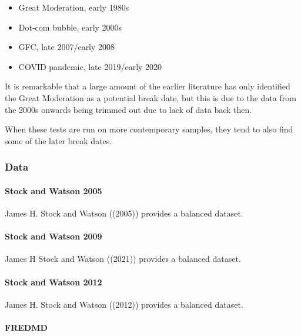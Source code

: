 \documentclass[
]{article}
\providecommand{\tightlist}{%
  \setlength{\itemsep}{0pt}\setlength{\parskip}{0pt}}
\begin{document}
\begin{itemize}
\tightlist
\item
  Great Moderation, early 1980s
\item
  Dot-com bubble, early 2000s
\item
  GFC, late 2007/early 2008
\item
  COVID pandemic, late 2019/early 2020
\end{itemize}

It is remarkable that a large amount of the earlier literature has only
identified the Great Moderation as a potential break date, but this is
due to the data from the 2000s onwards being trimmed out due to lack of
data back then.

When these tests are run on more contemporary samples, they tend to also
find some of the later break dates.

\hypertarget{data}{%
\subsubsection{Data}\label{data}}

\hypertarget{stock-and-watson-2005}{%
\paragraph{Stock and Watson 2005}\label{stock-and-watson-2005}}

James H. Stock and Watson ((2005)) provides a balanced dataset.

\hypertarget{stock-and-watson-2009}{%
\paragraph{Stock and Watson 2009}\label{stock-and-watson-2009}}

James H Stock and Watson ((2021)) provides a balanced dataset.

\hypertarget{stock-and-watson-2012}{%
\paragraph{Stock and Watson 2012}\label{stock-and-watson-2012}}

James H. Stock and Watson ((2012)) provides a balanced dataset.

\hypertarget{fredmd}{%
\paragraph{FREDMD}\label{fredmd}}
\end{document}
